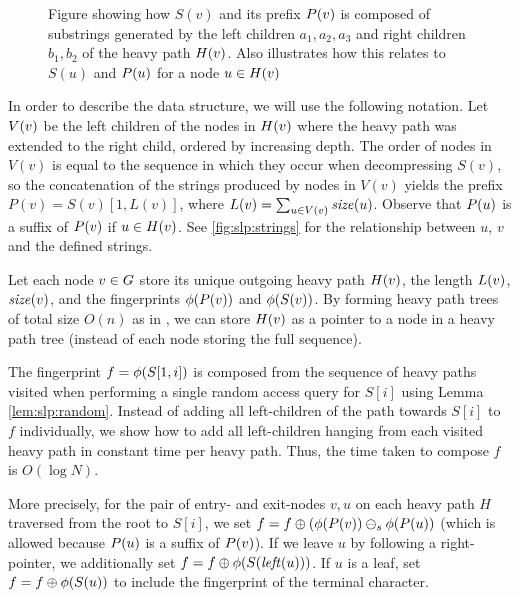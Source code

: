 \begin{figure}[tb]
\begin{center}
\begin{tikzpicture}
\end{tikzpicture}	
	\end{center}
	\caption{Figure showing how $S(v)$ and its prefix $\leftstring(v)$ is composed of substrings generated by the left children $a_1, a_2, a_3$ and right children $b_1, b_2$ of the heavy path $\heavypath(v)$. Also illustrates how this relates to $S(u)$ and $\leftstring(u)$ for a node $u \in \heavypath(v)$\label{fig:slp:strings}}
\end{figure}

In order to describe the data structure, we will use the following notation. Let $\leftnodes(v)$ be the left children of the nodes in $\heavypath(v)$ where the heavy path was extended to the right child, ordered by increasing depth. The order of nodes in $V(v)$ is equal to the sequence in which they occur when decompressing $S(v)$, so the concatenation of the strings produced by nodes in $V(v)$ yields the prefix $P(v)=S(v)[1,L(v)]$, where $\leftsize(v) = \sum_{u \in \leftnodes(v)} \size(u)$. Observe that $\leftstring(u)$ is a suffix of $\leftstring(v)$ if $u \in \heavypath(v)$. See \autoref{fig:slp:strings} for the relationship between $u$, $v$ and the defined strings.
 
Let each node $v \in \slp$ store its unique outgoing heavy path $\heavypath(v)$, the length $\leftsize(v)$, $\size(v)$, and the fingerprints $\fp(\leftstring(v))$ and $\fp(S(v))$. By forming heavy path trees of total size $O(n)$ as in \cite{bille2011random}, we can store $\heavypath(v)$ as a pointer to a node in a heavy path tree (instead of each node storing the full sequence).

The fingerprint $f = \fp(S[1, i])$ is composed from the sequence of heavy paths visited when performing a single random access query for $S[i]$ using Lemma \ref{lem:slp:random}. Instead of adding all left-children of the path towards $S[i]$ to $f$ individually, we show how to add all left-children hanging from each visited heavy path in constant time per heavy path. Thus, the time taken to compose $f$ is $O(\log N)$. 

More precisely, for the pair of entry- and exit-nodes $v, u$ on each heavy path $H$ traversed from the root to $S[i]$, we set $f = f \fpplus (\fp(\leftstring(v)) \fpdelsuffix \fp(\leftstring(u))$ (which is allowed because $\leftstring(u)$ is a suffix of $\leftstring(v)$). If we leave $u$ by following a right-pointer, we additionally set $f = f \fpplus \fp(S(\lchild(u)))$. If $u$ is a leaf, set $f = f \fpplus \fp(S(u))$ to include the fingerprint of the terminal character. 

